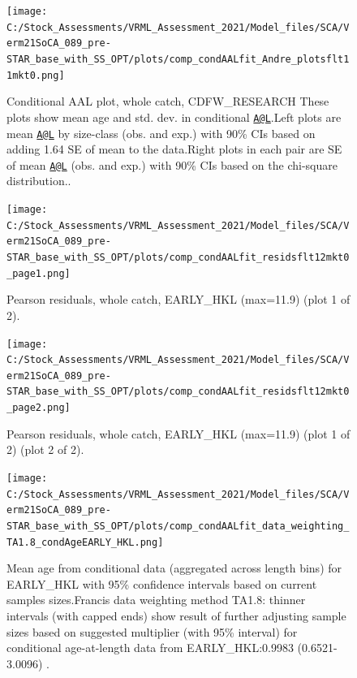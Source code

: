 \documentclass[11pt,
  english,
  a4paper,
]{article}
\begin{document}
\begin{figure}
\centering
\texttt{[image: C:/Stock\_Assessments/VRML\_Assessment\_2021/Model\_files/SCA/Verm21SoCA\_089\_pre-STAR\_base\_with\_SS\_OPT/plots/comp\_condAALfit\_Andre\_plotsflt11mkt0.png]}
\caption{Conditional AAL plot, whole catch, CDFW\_RESEARCH These plots show mean age and std. dev. in conditional {\href{mailto:A@L}{\nolinkurl{A@L}}\leavevmode\tagmcend\tagstructend}.Left plots are mean {\href{mailto:A@L}{\nolinkurl{A@L}}\leavevmode\tagmcend\tagstructend} by size-class (obs. and exp.) with 90\% CIs based on adding 1.64 SE of mean to the data.Right plots in each pair are SE of mean {\href{mailto:A@L}{\nolinkurl{A@L}}\leavevmode\tagmcend\tagstructend} (obs. and exp.) with 90\% CIs based on the chi-square distribution..\label{fig:comp_condAALfit_Andre_plotsflt11mkt0}}
\end{figure}

\begin{figure}
\centering
\texttt{[image: C:/Stock\_Assessments/VRML\_Assessment\_2021/Model\_files/SCA/Verm21SoCA\_089\_pre-STAR\_base\_with\_SS\_OPT/plots/comp\_condAALfit\_residsflt12mkt0\_page1.png]}
\caption{Pearson residuals, whole catch, EARLY\_HKL (max=11.9) (plot 1 of 2).\label{fig:comp_condAALfit_residsflt12mkt0_page1}}
\end{figure}

\begin{figure}
\centering
\texttt{[image: C:/Stock\_Assessments/VRML\_Assessment\_2021/Model\_files/SCA/Verm21SoCA\_089\_pre-STAR\_base\_with\_SS\_OPT/plots/comp\_condAALfit\_residsflt12mkt0\_page2.png]}
\caption{Pearson residuals, whole catch, EARLY\_HKL (max=11.9) (plot 1 of 2) (plot 2 of 2).\label{fig:comp_condAALfit_residsflt12mkt0_page2}}
\end{figure}

\begin{figure}
\centering
\texttt{[image: C:/Stock\_Assessments/VRML\_Assessment\_2021/Model\_files/SCA/Verm21SoCA\_089\_pre-STAR\_base\_with\_SS\_OPT/plots/comp\_condAALfit\_data\_weighting\_TA1.8\_condAgeEARLY\_HKL.png]}
\caption{Mean age from conditional data (aggregated across length bins) for EARLY\_HKL with 95\% confidence intervals based on current samples sizes.Francis data weighting method TA1.8: thinner intervals (with capped ends) show result of further adjusting sample sizes based on suggested multiplier (with 95\% interval) for conditional age-at-length data from EARLY\_HKL:0.9983 (0.6521-3.0096) .\label{fig:comp_condAALfit_data_weighting_TA1.8_condAgeEARLY_HKL}}
\end{figure}
\end{document}
